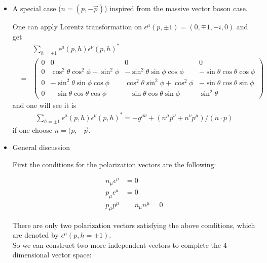 \documentclass[11pt]{article}
\def\eps{\epsilon}
\begin{document}
\section{ }
\begin{itemize}
    \item A special case ($n=(p,-\vec{p})$) inspired from the massive vector boson case.

    One can apply Lorentz transformation on $\eps^\mu(p,\pm1)= (0,\mp1,-i,0)$ and get 
    \begin{eqnarray}
        &&\sum_{h=\pm 1} \eps^\mu(p,h) \eps^\nu(p,h)^*\nonumber \\&=&
        \begin{pmatrix}
            0 & 0 & 0 & 0 \\
            0 & \cos^2\theta\cos^2\phi+\sin^2\phi & -\sin^2\theta\sin\phi\cos\phi  & -\sin\theta\cos\theta\cos\phi \\
            0 & -\sin^2\theta\sin\phi\cos\phi & \cos^2\theta\sin^2\phi  + \cos^2\phi & -\sin\theta\cos\theta \sin\phi  \\
            0 &  -\sin\theta\cos\theta\cos\phi & -\sin\theta\cos\theta\sin\phi  & \sin^2\theta
        \end{pmatrix}
    \end{eqnarray}
    and one will see it is
    \begin{eqnarray}
        \sum_{h=\pm 1} \eps^\mu(p,h) \eps^\nu(p,h)^*
          = -g^{\mu\nu} + (n^\mu p^\nu + n^\nu p^\mu)/(n\cdot p) 
    \end{eqnarray}
    if one choose $n=(p,-\vec{p}$.
    
    \item General discussion
    
    First the conditions for the polarization vectors are the following:
    
    \begin{align}
        n_\mu \epsilon^\mu & = 0\\
        p_\mu \epsilon^\mu & = 0\\
        p_\mu p^\mu & = n_\mu n^\mu = 0
    \end{align}
    
    There are only two polarization vectors satisfying the above conditions, which are denoted by $\epsilon^\mu(p,h=\pm 1)$.\\
    
    So we can construct two more independent vectors to complete the 4-dimensional vector space:
    

\end{itemize}
\end{document}
